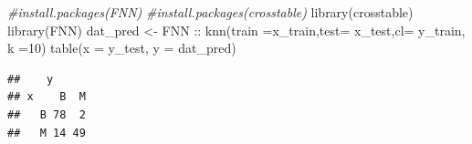 \documentclass[
  11pt,
]{article}
\newenvironment{Shaded}{\begin{snugshade}}{\end{snugshade}}
\newcommand{\AttributeTok}[1]{\textcolor[rgb]{0.77,0.63,0.00}{#1}}
\newcommand{\CommentTok}[1]{\textcolor[rgb]{0.56,0.35,0.01}{\textit{#1}}}
\newcommand{\DecValTok}[1]{\textcolor[rgb]{0.00,0.00,0.81}{#1}}
\newcommand{\FunctionTok}[1]{\textcolor[rgb]{0.00,0.00,0.00}{#1}}
\newcommand{\NormalTok}[1]{#1}
\newcommand{\OtherTok}[1]{\textcolor[rgb]{0.56,0.35,0.01}{#1}}
\newcommand{\SpecialCharTok}[1]{\textcolor[rgb]{0.00,0.00,0.00}{#1}}
\newcommand{\StringTok}[1]{\textcolor[rgb]{0.31,0.60,0.02}{#1}}
\begin{document}
\begin{Shaded}
\begin{Highlighting}[]
\CommentTok{\#install.packages(\textquotesingle{}FNN\textquotesingle{})}
\CommentTok{\#install.packages(\textquotesingle{}crosstable\textquotesingle{})}
\FunctionTok{library}\NormalTok{(crosstable)}
\FunctionTok{library}\NormalTok{(}\StringTok{\textquotesingle{}FNN\textquotesingle{}}\NormalTok{)}
\NormalTok{dat\_pred }\OtherTok{\textless{}{-}}\NormalTok{ FNN }\SpecialCharTok{::} \FunctionTok{knn}\NormalTok{(}\AttributeTok{train =}\NormalTok{x\_train,}\AttributeTok{test=}\NormalTok{  x\_test,}\AttributeTok{cl=}\NormalTok{ y\_train, }\AttributeTok{k =}\DecValTok{10}\NormalTok{)}
\FunctionTok{table}\NormalTok{(}\AttributeTok{x =}\NormalTok{ y\_test, }\AttributeTok{y =}\NormalTok{ dat\_pred)}
\end{Highlighting}
\end{Shaded}

\begin{verbatim}
##    y
## x    B  M
##   B 78  2
##   M 14 49
\end{verbatim}

\begin{Shaded}
\end{Shaded}
\end{document}
